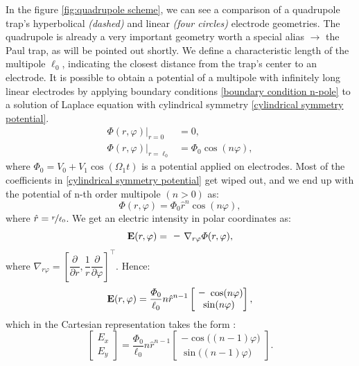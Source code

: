 In the figure \ref{fig:quadrupole scheme}, we can see a comparison of a quadrupole trap's hyperbolical \textit{(dashed)} and linear \textit{(four circles)} electrode geometries. The quadrupole is already a very important geometry worth a special alias $\rightarrow$ the Paul trap, as will be pointed out shortly. We define a characteristic length of the multipole $\ell_0$, indicating the closest distance from the trap's center to an electrode. It is possible to obtain a potential of a multipole with infinitely long linear electrodes by applying boundary conditions \eqref{boundary condition n-pole} to a solution of Laplace equation with cylindrical symmetry \eqref{cylindrical symmetry potential}.
\begin{subequations}
\label{boundary condition n-pole}
\begin{align}
	\Phi(r,\varphi)\vert_{r=0}&=0, \\
	\Phi(r,\varphi)\vert_{r=\ell_0}&=\Phi_0 \cos(n\varphi),
\end{align}
\end{subequations}
where $\Phi_0 = V_0 + V_1 \cos(\Omega_1 t)$ is a potential applied on electrodes. Most of the coefficients in \eqref{cylindrical symmetry potential} get wiped out, and we end up with the potential of n-th order multipole $(n > 0)$ as:
\begin{equation}
	\label{potential n-pole}
	\Phi(r,\varphi) = \Phi_0 \hat{r}^n \cos(n\varphi),	
\end{equation}
where $\hat{r} = \nicefrac{r}{\ell_0}$. We get an electric intensity in polar coordinates as: 
\begin{equation}
	\vb{E}(r,\varphi) = \minus\nabla_{r\varphi} \Phi(r,\varphi),
\end{equation}
where $\nabla_{r\varphi} = \left[\dfrac{\partial}{\partial r}, \dfrac{1}{r} \dfrac{\partial}{\partial \varphi}\right]^\top$. Hence:
\begin{equation}
\label{need this for norm(E_0)}
\vb{E}(r,\varphi) = \dfrac{\Phi_0}{\ell_0} n \hat{r}^{n-1} 
\begin{bmatrix}
	\minus\cos(n\varphi) \\
	\sin(n\varphi)
\end{bmatrix},
\end{equation}
which in the Cartesian representation takes the form \cite{gerlich1992inhomogeneous}:
\begin{equation}
\begin{bmatrix}
	E_x \\
	E_y
\end{bmatrix}
 = \dfrac{\Phi_0}{\ell_0} n \hat{r}^{n-1} 
\begin{bmatrix}
	\minus\cos\big((n \minus 1)\varphi\big) \\
	\sin\big((n \minus 1)\varphi\big)
\end{bmatrix}.
\end{equation}
